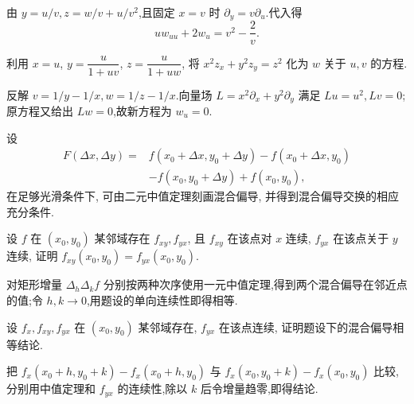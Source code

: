 \begin{solution}
    由 $y=u/v,z=w/v+u/v^2$,且固定 $x=v$ 时 $\partial_y=v\partial_u$.代入得
    \[
        u w_{uu}+2w_u=v^2-\dfrac{2}{v}.
    \]
\end{solution}

\begin{example}
    利用 $x=u$, $\displaystyle y=\dfrac{u}{1+uv}$, $\displaystyle z=\dfrac{u}{1+uw}$, 将 $x^2z_x+y^2z_y=z^2$ 化为 $w$ 关于 $u,v$ 的方程.
\end{example}
\exampleblank

\begin{solution}
    反解 $v=1/y-1/x,w=1/z-1/x$.向量场 $L=x^2\partial_x+y^2\partial_y$ 满足 $Lu=u^2,Lv=0$;原方程又给出 $Lw=0$,故新方程为 $w_u=0$.
\end{solution}

\begin{proposition}[\markstar]
    设
    \[
        \begin{aligned}
            F(\Delta x,\Delta y)={} & f(x_0+\Delta x,y_0+\Delta y)-f(x_0+\Delta x,y_0) \\
                                    & -f(x_0,y_0+\Delta y)+f(x_0,y_0),
        \end{aligned}
    \]
    在足够光滑条件下, 可由二元中值定理刻画混合偏导, 并得到混合偏导交换的相应充分条件.
\end{proposition}

\begin{example}
    设 $f$ 在 $(x_0,y_0)$ 某邻域存在 $f_{xy},f_{yx}$, 且 $f_{xy}$ 在该点对 $x$ 连续, $f_{yx}$ 在该点关于 $y$ 连续, 证明 $f_{xy}(x_0,y_0)=f_{yx}(x_0,y_0)$.
\end{example}
\exampleblank

\begin{solution}
    对矩形增量 $\Delta_h\Delta_kf$ 分别按两种次序使用一元中值定理,得到两个混合偏导在邻近点的值;令 $h,k\to0$,用题设的单向连续性即得相等.
\end{solution}

\begin{example}
    设 $f_x,f_{xy},f_{yx}$ 在 $(x_0,y_0)$ 某邻域存在, $f_{yx}$ 在该点连续, 证明题设下的混合偏导相等结论.
\end{example}
\exampleblank

\begin{solution}
    把 $f_x(x_0+h,y_0+k)-f_x(x_0+h,y_0)$ 与 $f_x(x_0,y_0+k)-f_x(x_0,y_0)$ 比较,分别用中值定理和 $f_{yx}$ 的连续性,除以 $k$ 后令增量趋零,即得结论.
\end{solution}

